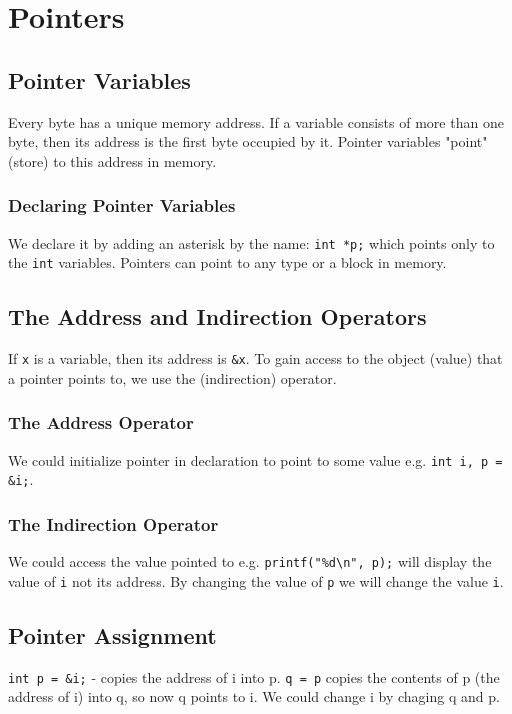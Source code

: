 \documentclass[openany]{book}
\begin{document}
    \chapter{Pointers}

    \section{Pointer Variables}
    Every byte has a unique memory address. If a variable consists of more than one byte, then its
    address is the first byte occupied by it. Pointer variables "point" (store) to this address in memory.

    \subsection*{Declaring Pointer Variables}
    We declare it by adding an asterisk by the name: \texttt{int *p;} which points only to the
    \texttt{int} variables. Pointers can point to any type or a block in memory.

    \section{The Address and Indirection Operators}
    If \texttt{x} is a variable, then its address is \texttt{\&x}. To gain access to the object
    (value) that a pointer points to, we use the \texttt{} (indirection) operator.

    \subsection*{The Address Operator}
    We could initialize pointer in declaration to point to some value e.g. \texttt{int i, p = \&i;}.

    \subsection*{The Indirection Operator}
    We could access the value pointed to e.g. \texttt{printf("\%d\textbackslash n", p);} will
    display the value of \texttt{i} not its address. By changing the value of \texttt{p} we will
    change the value \texttt{i}.

    \section{Pointer Assignment}
    \texttt{int p = \&i;} - copies the address of i into p. \texttt{q = p} copies the contents of p
    (the address of i) into q, so now q points to i. We could change i by chaging q and p.
\end{document}
